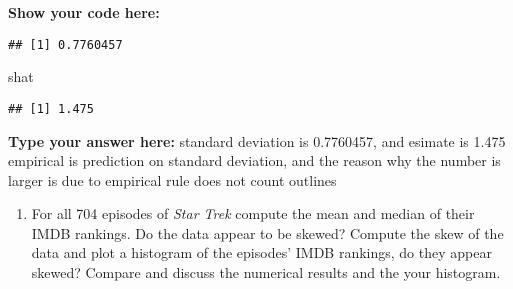 \documentclass[
]{article}
\newenvironment{Shaded}{\begin{snugshade}}{\end{snugshade}}
\newcommand{\CommentTok}[1]{\textcolor[rgb]{0.56,0.35,0.01}{\textit{#1}}}
\newcommand{\DecValTok}[1]{\textcolor[rgb]{0.00,0.00,0.81}{#1}}
\newcommand{\KeywordTok}[1]{\textcolor[rgb]{0.13,0.29,0.53}{\textbf{#1}}}
\newcommand{\NormalTok}[1]{#1}
\newcommand{\OperatorTok}[1]{\textcolor[rgb]{0.81,0.36,0.00}{\textbf{#1}}}
\newcommand{\StringTok}[1]{\textcolor[rgb]{0.31,0.60,0.02}{#1}}
\providecommand{\tightlist}{%
  \setlength{\itemsep}{0pt}\setlength{\parskip}{0pt}}
\begin{document}
\textbf{Show your code here:}

\begin{Shaded}
\end{Shaded}

\begin{verbatim}
## [1] 0.7760457
\end{verbatim}

\begin{Shaded}
\begin{Highlighting}[]
\NormalTok{shat}
\end{Highlighting}
\end{Shaded}

\begin{verbatim}
## [1] 1.475
\end{verbatim}

\textbf{Type your answer here:} standard deviation is 0.7760457, and
esimate is 1.475 empirical is prediction on standard deviation, and the
reason why the number is larger is due to empirical rule does not count
outlines

\begin{enumerate}
\def\labelenumi{\alph{enumi}.}
\setcounter{enumi}{1}
\tightlist
\item
  For all 704 episodes of \emph{Star Trek} compute the mean and median
  of their IMDB rankings. Do the data appear to be skewed? Compute the
  skew of the data and plot a histogram of the episodes' IMDB rankings,
  do they appear skewed? Compare and discuss the numerical results and
  the your histogram.
\end{enumerate}
\end{document}
